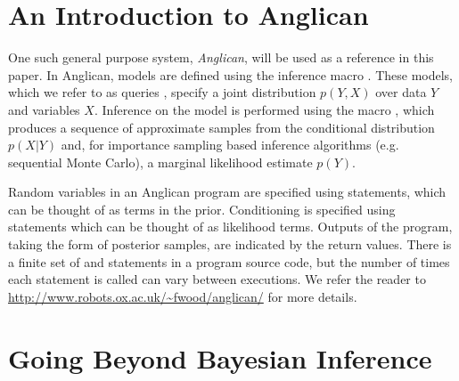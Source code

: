



\section{An Introduction to Anglican}
\label{sec:probprog:anglican}

One such general purpose system, \emph{Anglican}, will be used as a reference in this paper.  In Anglican, models are defined using the inference macro . These models, which we refer to as queries \citep{goodman_uai_2008}, specify a joint distribution $p(Y,X)$ over data $Y$ and variables $X$. Inference on the model is performed using the macro \doquery, which produces a sequence of approximate samples from the conditional distribution $p(X|Y)$ and, for importance sampling based inference algorithms (e.g. sequential Monte Carlo), a marginal likelihood estimate $p(Y)$.  

Random variables in an Anglican program are specified using \sample statements, which can be thought of as terms in the prior. Conditioning is specified using \observe statements which can be thought of as likelihood terms.  Outputs of the program, taking the form of posterior samples, are indicated by the return values.  There is a finite set of \sample and \observe statements in a program source code, but the number of times each statement is called can vary between executions.  We refer the reader to  \href{http://www.robots.ox.ac.uk/~fwood/anglican/}{\small\url{http://www.robots.ox.ac.uk/~fwood/anglican/}} for more details.

\section{Going Beyond Bayesian Inference}
\label{sec:probprog:limit}
